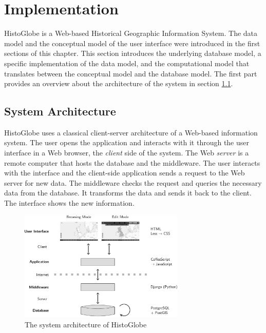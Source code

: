 
\section{Implementation} %
\label{sec:implementation}

HistoGlobe is a Web-based Historical Geographic Information System. The data model and the conceptual model of the user interface were introduced in the first sections of this chapter. This section introduces the underlying database model, a specific implementation of the data model, and the computational model that translates between the conceptual model and the database model. The first part provides an overview about the architecture of the system in section \ref{sub:system_architecture}.

\subsection{System Architecture} %
\label{sub:system_architecture}

HistoGlobe uses a classical client-server architecture of a Web-based information system. The user opens the application and interacts with it through the user interface in a Web browser, the \emph{client} side of the system. The Web \emph{server} is a remote computer that hosts the database and the middleware. The user interacts with the interface and the client-side application sends a request to the Web server for new data. The middleware checks the request and queries the necessary data from the database. It transforms the data and sends it back to the client. The interface shows the new information.

\begin{figure}[H]
  \vspace{1em}
  \centering
  \includegraphics[width=0.7\textwidth]{graphics/development/application/system_architecture}
  \caption{The system architecture of HistoGlobe}
  \label{fig:system_architecture}
\end{figure}

